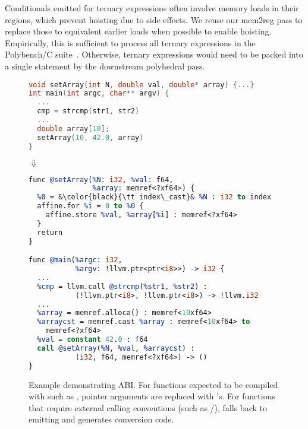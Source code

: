 Conditionals emitted for ternary expressions often involve memory loads in their regions, which prevent hoisting due to side effects. We reuse our mem2reg pass to replace those to equivalent earlier loads when possible to enable hoisting. Empirically, this is sufficient to process all ternary expressions in the Polybench/C suite~\cite{polybench}. Otherwise, ternary expressions would need to be packed into a single statement by the downstream polyhedral pass.

\begin{figure}
    \centering
    {\scriptsize
\begin{lstlisting}[language=c]
void setArray(int N, double val, double* array) {...}
int main(int argc, char** argv) {
  ...
  cmp = strcmp(str1, str2)
  ...
  double array[10];
  setArray(10, 42.0, array)
}
\end{lstlisting}}
\vspace{-0.5cm}
$\Downarrow$
{\scriptsize
\begin{lstlisting}[language=llvm, escapeinside=&&]
func @setArray(%N: i32, %val: f64,
               %array: memref<?xf64>) {
  %0 = &\color{black}{\tt index\_cast}& %N : i32 to index
  affine.for %i = 0 to %0 {
    affine.store %val, %array[%i] : memref<?xf64>
  }
  return
}

func @main(%argc: i32,
           %argv: !llvm.ptr<ptr<i8>>) -> i32 {
  ...
  %cmp = llvm.call @strcmp(%str1, %str2) :
           (!llvm.ptr<i8>, !llvm.ptr<i8>) -> !llvm.i32
  ...
  %array = memref.alloca() : memref<10xf64>
  %arraycst = memref.cast %array : memref<10xf64> to 
    memref<?xf64>
  %val = constant 42.0 : f64
  call @setArray(%N, %val, %arraycst) :
           (i32, f64, memref<?xf64>) -> ()
}
\end{lstlisting}}
    \caption{Example demonstrating \tool ABI. For functions expected to be compiled with \tool such as , pointer arguments are replaced with \memref's. For functions that require external calling conventions (such as /), \tool falls back to emitting  and generates conversion code.}
    \label{fig:abi}
\end{figure}